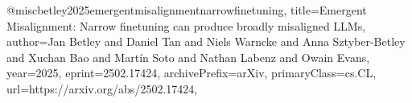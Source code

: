@misc{betley2025emergentmisalignmentnarrowfinetuning,
      title={Emergent Misalignment: Narrow finetuning can produce broadly misaligned LLMs}, 
      author={Jan Betley and Daniel Tan and Niels Warncke and Anna Sztyber-Betley and Xuchan Bao and Martín Soto and Nathan Labenz and Owain Evans},
      year={2025},
      eprint={2502.17424},
      archivePrefix={arXiv},
      primaryClass={cs.CL},
      url={https://arxiv.org/abs/2502.17424}, 
}